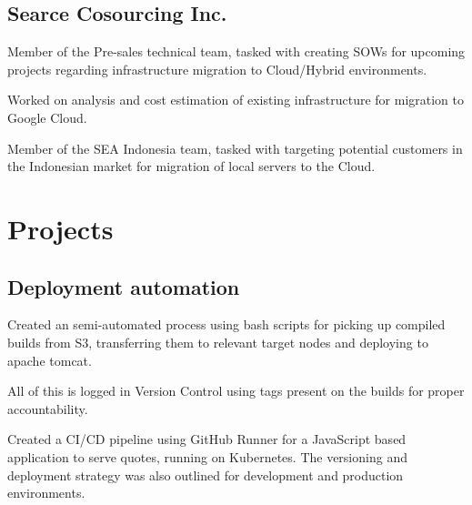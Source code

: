 \documentclass[]{plushcv}
\begin{document}
\begin{minipage}[t]{0.8\textwidth}
\subsection{Searce Cosourcing Inc.}
\begin{tightemize}
\sectionsep
\item[\textbullet{}] Member of the Pre-sales technical team, tasked with creating SOWs for upcoming projects regarding infrastructure migration to Cloud/Hybrid environments.
\item[\textbullet{}] Worked on analysis and cost estimation of existing infrastructure for migration to Google Cloud.
\item[\textbullet{}]  Member of the SEA Indonesia team, tasked with targeting potential customers in the Indonesian market for migration of local servers to the Cloud.  
\end{tightemize}
\sectionsep


\vspace{-0.375cm}
\section{Projects}
\subsection{Deployment automation}
\begin{tightemize}
\item[\textbullet{}] Created an semi-automated process using bash scripts for picking up compiled builds from S3, transferring them to relevant target nodes and deploying to apache tomcat.
\item[\textbullet{}] All of this is logged in Version Control using tags present on the builds for proper accountability.
\end{tightemize}
\begin{tightemize}
\item[\textopenbullet{}] Created a CI/CD pipeline using GitHub Runner for a JavaScript based application to serve quotes, running on Kubernetes. The versioning and deployment strategy was also outlined for development and production environments.
\end{tightemize}
\sectionsep


\end{minipage}
\end{document}
